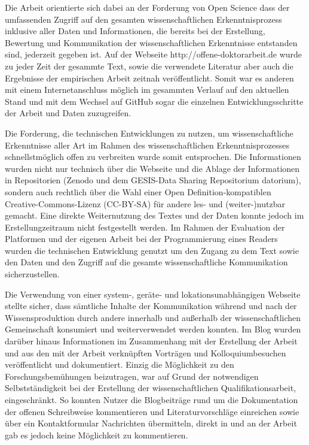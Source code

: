 Die Arbeit orientierte sich dabei an der Forderung von Open Science dass der umfassenden Zugriff auf den gesamten wissenschaftlichen Erkenntnisprozess inklusive aller Daten und Informationen, die bereits bei der Erstellung, Bewertung und Kommunikation der wissenschaftlichen Erkenntnisse entstanden sind, jederzeit gegeben ist. Auf der Webseite http://offene-doktorarbeit.de wurde zu jeder Zeit der gesammte Text, sowie die verwendete Literatur aber auch die Ergebnisse der empirischen Arbeit zeitnah veröffentlicht. Somit war es anderen mit einem Internetanschluss möglich im gesammten Verlauf auf den aktuellen Stand und mit dem Wechsel auf GitHub sogar die einzelnen Entwicklungsschritte der Arbeit und Daten zuzugreifen.

Die Forderung, die technischen Entwicklungen zu nutzen, um wissenschaftliche Erkenntnisse aller Art im Rahmen des wissenschaftlichen Erkenntnisprozesses schnellstmöglich offen zu verbreiten wurde somit entsprochen. Die Informationen wurden nicht nur technisch über die Webseite und die Ablage der Informationen in Repositorien (Zenodo und dem GESIS-Data Sharing Repositorium datorium), sondern auch rechtlich über die Wahl einer Open Definition-kompatiblen Creative-Commons-Lizenz (CC-BY-SA) für andere les- und (weiter-)nutzbar gemacht. Eine direkte Weiternutzung des Textes und der Daten konnte jedoch im Erstellungzeitraum nicht festgestellt werden. Im Rahmen der Evaluation der Platformen und der eigenen Arbeit bei der Programmierung eines Readers wurden die technischen Entwicklung genutzt um den Zugang zu dem Text sowie den Daten und den Zugriff auf die gesamte wissenschaftliche Kommunikation sicherzustellen.

Die Verwendung von einer system-, geräte- und lokationsunabhängigen Webseite stellte sicher, dass sämtliche Inhalte der Kommunikation während und nach der Wissensproduktion durch andere innerhalb und außerhalb der wissenschaftlichen Gemeinschaft konsumiert und weiterverwendet werden konnten. Im Blog wurden darüber hinaus Informationen im Zusammenhang mit der Erstellung der Arbeit und aus den mit der Arbeit verknüpften Vorträgen und Kolloquiumbesuchen veröffentlicht und dokumentiert. Einzig die Möglichkeit zu den Forschungsbemühungen beizutragen, war auf Grund der notwendigen Selbstständigkeit bei der Erstellung der wissenschaftlichen Qualifikationsarbeit, eingeschränkt. So konnten Nutzer die Blogbeiträge rund um die Dokumentation der offenen Schreibweise kommentieren und Literaturvorschläge einreichen sowie über ein Kontaktformular Nachrichten übermitteln, direkt in und an der Arbeit gab es jedoch keine Möglichkeit zu kommentieren.

